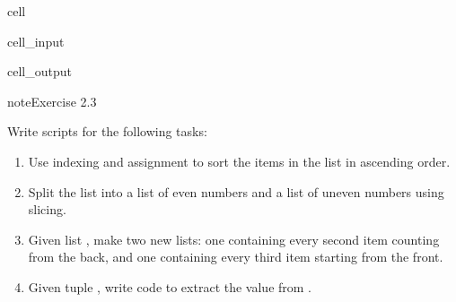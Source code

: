 \documentclass[letterpaper,10pt,english]{jupyterBook}
\begin{document}
\begin{sphinxuseclass}{cell}\begin{sphinxVerbatimInput}

\begin{sphinxuseclass}{cell_input}
\begin{sphinxVerbatim}[commandchars=\\\{\}]
  \PYG{p}{[}  \PYG{p}{]}
\end{sphinxVerbatim}

\end{sphinxuseclass}\end{sphinxVerbatimInput}
\begin{sphinxVerbatimOutput}

\begin{sphinxuseclass}{cell_output}
\begin{sphinxVerbatim}
\end{sphinxVerbatim}

\end{sphinxuseclass}\end{sphinxVerbatimOutput}

\end{sphinxuseclass}
\begin{sphinxadmonition}{note}{Exercise 2.3}

\sphinxAtStartPar
Write scripts for the following tasks:
\begin{enumerate}
%
\item {} 
\sphinxAtStartPar
Use indexing and assignment to sort the items in the list  in ascending order.

\item {} 
\sphinxAtStartPar
Split the list  into a list of even numbers and a list of uneven numbers using slicing.

\item {} 
\sphinxAtStartPar
Given list , make two new lists: one containing every second item counting from the back, and one containing every third item starting from the front.

\item {} 
\sphinxAtStartPar
Given tuple , write code to extract the value  from .

\end{enumerate}
\end{sphinxadmonition}
\end{document}
